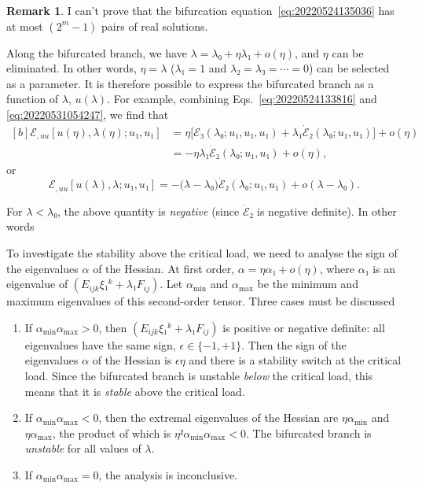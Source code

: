 \documentclass[12pt, final]{scrartcl}
\theoremstyle{definition}
\newtheorem{remark}{Remark}
\begin{document}
\begin{remark}
  I can't prove that the bifurcation equation~\eqref{eq:20220524135036} has at
  most \((2^m - 1)\) pairs of real solutions.
\end{remark}

Along the bifurcated branch, we have \(λ = λ₀ + η λ₁ + o(η)\), and \(η\) can be
eliminated. In other words, \(η=λ\) (\(λ₁=1\) and \(λ₂ = λ₃ = \cdots = 0\)) can
be selected as a parameter. It is therefore possible to express the bifurcated
branch as a function of \(λ\), \(u(λ)\). For example, combining
Eqs.~\eqref{eq:20220524133816} and \eqref{eq:20220531054247}, we find that
\begin{equation}
  \begin{aligned}[b]
    ℰ_{, uu}[u(η), λ(η); u₁, u₁]
    &= η \bigl[ℰ₃(λ₀ ; u₁, u₁, u₁)  + λ₁ \dot{ℰ}₂(λ₀; u₁, u₁)\bigr] + o(η)\\
    &= - η λ₁ \dot{ℰ}₂(λ₀; u₁, u₁) + o(η),
  \end{aligned}
\end{equation}
or
\begin{equation}
  ℰ_{, uu}[u(λ), λ; u₁, u₁] = -\bigl( λ - λ₀ \bigr) \dot{ℰ}₂(λ₀; u₁, u₁) + o(λ - λ₀).
\end{equation}

For \(λ < λ₀\), the above quantity is \emph{negative} (since \(\dot{ℰ}₂\) is
negative definite). In other words

\begin{center}
\end{center}

To investigate the stability above the critical load, we need to analyse the
sign of the eigenvalues \(α\) of the Hessian. At first order,
\(α = η α₁ + o(η)\), where \(α₁\) is an eigenvalue of
\((E_{ijk} ξ₁^k + λ₁ F_{ij})\). Let \(α_{\min}\) and \(α_{\max}\) be the minimum
and maximum eigenvalues of this second-order tensor. Three cases must be
discussed
\begin{enumerate}
\item If \(α_{\min} α_{\max} > 0\), then \((E_{ijk} ξ₁^k + λ₁ F_{ij})\) is
  positive or negative definite: all eigenvalues have the same sign,
  \(\epsilon ∈ \{-1, +1\}\). Then the sign of the eigenvalues \(α\) of the
  Hessian is \(\epsilon η\) and there is a stability switch at the critical
  load. Since the bifurcated branch is unstable \emph{below} the critical load,
  this means that it is \emph{stable} above the critical load.
\item If \(α_{\min} α_{\max} < 0\), then the extremal eigenvalues of the Hessian
  are \(η α_{\min}\) and \(η α_{\max}\), the product of which is
  \(η² α_{\min} α_{\max} < 0\). The bifurcated branch is \emph{unstable} for all
  values of \(λ\).
\item If \(α_{\min} α_{\max} = 0\), the analysis is inconclusive.
\end{enumerate}
\end{document}
